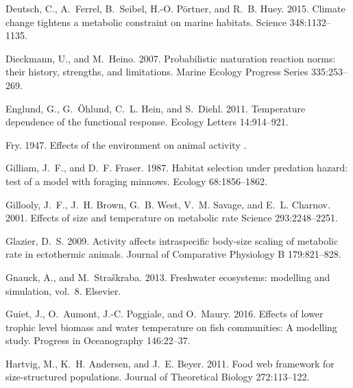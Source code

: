 \documentclass[11pt]{article}\usepackage[]{graphicx}\usepackage[]{color,soul}
\begin{document}
\begin{thebibliography}{62}
Deutsch, C., A.~Ferrel, B.~Seibel, H.-O. Pörtner, and R.~B. Huey. 2015.
\newblock Climate change tightens a metabolic constraint on marine habitats.
\newblock Science 348:1132--1135.

Dieckmann, U., and M.~Heino. 2007.
\newblock Probabilistic maturation reaction norms: their history, strengths,
  and limitations.
\newblock Marine Ecology Progress Series 335:253--269.

Englund, G., G.~Öhlund, C.~L. Hein, and S.~Diehl. 2011.
\newblock Temperature dependence of the functional response.
\newblock Ecology Letters 14:914--921.

Fry. 1947.
\newblock Effects of the environment on animal activity .

Gilliam, J.~F., and D.~F. Fraser. 1987.
\newblock Habitat selection under predation hazard: test of a model with
  foraging minnows.
\newblock Ecology 68:1856--1862.

Gillooly, J.~F., J.~H. Brown, G.~B. West, V.~M. Savage, and E.~L. Charnov. 2001.
\newblock Effects of size and temperature on metabolic rate 
\newblock Science 293:2248--2251.

Glazier, D.~S. 2009.
\newblock Activity affects intraspecific body-size scaling of metabolic rate in
  ectothermic animals.
\newblock Journal of Comparative Physiology B 179:821--828.

Gnauck, A., and M.~Stra{\v{s}}kraba. 2013.
\newblock Freshwater ecosystems: modelling and simulation, vol.~8.
\newblock Elsevier.

Guiet, J., O.~Aumont, J.-C. Poggiale, and O.~Maury. 2016.
\newblock Effects of lower trophic level biomass and water temperature on fish
  communities: A modelling study.
\newblock Progress in Oceanography 146:22--37.

Hartvig, M., K.~H. Andersen, and J.~E. Beyer. 2011.
\newblock Food web framework for size-structured populations.
\newblock Journal of Theoretical Biology 272:113--122.


\end{thebibliography}
\end{document}
